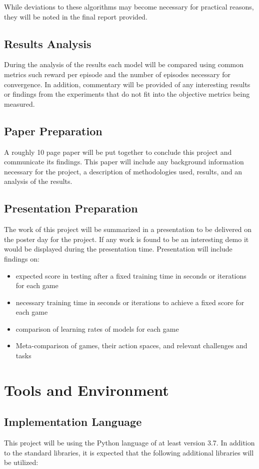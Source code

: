 \documentclass[conference]{IEEEtran}
\begin{document}
While deviations to these algorithms may become necessary for practical reasons, they will be noted in the final report provided.

\subsection{Results Analysis}
During the analysis of the results each model will be compared using common metrics such reward per episode and the number of episodes necessary for convergence.
In addition, commentary will be provided of any interesting results or findings from the experiments that do not fit into the objective metrics being measured.

\subsection{Paper Preparation}
A roughly 10 page paper will be put together to conclude this project and communicate its findings.
This paper will include any background information necessary for the project, a description of methodologies used, results, and an analysis of the results.

\subsection{Presentation Preparation}
The work of this project will be summarized in a presentation to be delivered on the poster day for the project.
If any work is found to be an interesting demo it would be displayed during the presentation time. Presentation will include findings on:
\begin{itemize}
    \item expected score in testing after a fixed training time in seconds or iterations for each game
    \item necessary training time in seconds or iterations to achieve a fixed score for each game
    \item comparison of learning rates of models for each game
    \item Meta-comparison of games, their action spaces, and relevant challenges and tasks
\end{itemize}

\section{Tools and Environment}

\subsection{Implementation Language}
This project will be using the Python language of at least version 3.7.
In addition to the standard libraries, it is expected that the following additional libraries will be utilized:
 
\end{document}
